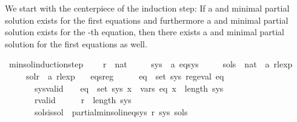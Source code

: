 \begin{isabellebody}
\begin{isamarkuptext}
We start with the centerpiece of the induction step: If a  and minimal partial solution
 exists for the first  equations and furthermore a  and minimal partial solution
 exists for the -th equation, then there exists a  and minimal partial solution
for the first  equations as well.%
\end{isamarkuptext}\isamarkuptrue%
\isamarkupfalse%
\ min{\isacharunderscore}{\kern0pt}sol{\isacharunderscore}{\kern0pt}induction{\isacharunderscore}{\kern0pt}step\ {\isacharequal}{\kern0pt}\isanewline
\ \ \ r\ {\isacharcolon}{\kern0pt}{\isacharcolon}{\kern0pt}\ nat\isanewline
\ \ \ \ \ sys\ {\isacharcolon}{\kern0pt}{\isacharcolon}{\kern0pt}\ {\isachardoublequoteopen}{\isacharprime}{\kern0pt}a\ eq{\isacharunderscore}{\kern0pt}sys{\isachardoublequoteclose}\isanewline
\ \ \ \ \ sols\ {\isacharcolon}{\kern0pt}{\isacharcolon}{\kern0pt}\ {\isachardoublequoteopen}nat\ {\isasymRightarrow}\ {\isacharprime}{\kern0pt}a\ rlexp{\isachardoublequoteclose}\isanewline
\ \ \ \ \ sol{\isacharunderscore}{\kern0pt}r\ {\isacharcolon}{\kern0pt}{\isacharcolon}{\kern0pt}\ {\isachardoublequoteopen}{\isacharprime}{\kern0pt}a\ rlexp{\isachardoublequoteclose}\isanewline
\ \ \ eqs{\isacharunderscore}{\kern0pt}reg{\isacharcolon}{\kern0pt}\ \ \ \ \ \ {\isachardoublequoteopen}{\isasymforall}eq\ {\isasymin}\ set\ sys{\isachardot}{\kern0pt}\ reg{\isacharunderscore}{\kern0pt}eval\ eq{\isachardoublequoteclose}\isanewline
\ \ \ \ \ \ \ sys{\isacharunderscore}{\kern0pt}valid{\isacharcolon}{\kern0pt}\ \ \ \ {\isachardoublequoteopen}{\isasymforall}eq\ {\isasymin}\ set\ sys{\isachardot}{\kern0pt}\ {\isasymforall}x\ {\isasymin}\ vars\ eq{\isachardot}{\kern0pt}\ x\ {\isacharless}{\kern0pt}\ length\ sys{\isachardoublequoteclose}\isanewline
\ \ \ \ \ \ \ r{\isacharunderscore}{\kern0pt}valid{\isacharcolon}{\kern0pt}\ \ \ \ \ \ {\isachardoublequoteopen}r\ {\isacharless}{\kern0pt}\ length\ sys{\isachardoublequoteclose}\isanewline
\ \ \ \ \ \ \ sols{\isacharunderscore}{\kern0pt}is{\isacharunderscore}{\kern0pt}sol{\isacharcolon}{\kern0pt}\ \ {\isachardoublequoteopen}partial{\isacharunderscore}{\kern0pt}min{\isacharunderscore}{\kern0pt}sol{\isacharunderscore}{\kern0pt}ineq{\isacharunderscore}{\kern0pt}sys\ r\ sys\ sols{\isachardoublequoteclose}\isanewline

\end{isabellebody}
